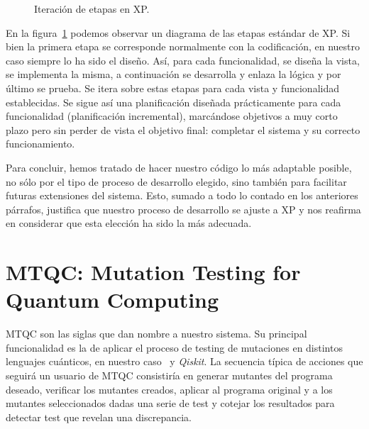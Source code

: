\begin{figure}[t]
\begin{center}
\end{center}
\caption{Iteración de etapas en XP.}
\label{fig:fig1}
\end{figure}

En la figura~\ref{fig:fig1} podemos observar un diagrama de las etapas estándar de XP. Si bien la primera etapa se corresponde normalmente con la codificación, en nuestro caso siempre lo ha sido el diseño. Así, para cada funcionalidad, se diseña la vista, se implementa la misma, a continuación se desarrolla y enlaza la lógica y por último se prueba. Se itera sobre estas etapas para cada vista y funcionalidad establecidas.
%
Se sigue así una planificación diseñada prácticamente para cada funcionalidad (planificación incremental), marcándose objetivos a muy corto plazo pero sin perder de vista el objetivo final: completar el sistema y su correcto funcionamiento.

Para concluir, hemos tratado de hacer nuestro código lo más adaptable posible, no sólo por el tipo de proceso de desarrollo elegido, sino también para facilitar futuras extensiones del sistema. Esto, sumado a todo lo contado en los anteriores párrafos, justifica que nuestro proceso de desarrollo se ajuste a XP y nos reafirma en considerar que esta  elección ha sido la más adecuada.

\section{MTQC: Mutation Testing for Quantum Computing}

MTQC son las siglas que dan nombre a nuestro sistema. Su principal funcionalidad es la de aplicar el proceso  de testing de mutaciones en distintos lenguajes cuánticos, en nuestro caso \qsh\ y \textit{Qiskit}.
%
La secuencia típica de acciones que seguirá  un usuario de MTQC consistiría en generar mutantes del programa deseado, verificar los mutantes creados, aplicar al programa original y a los mutantes seleccionados dadas una serie de test y cotejar los resultados para detectar test que revelan una discrepancia.

